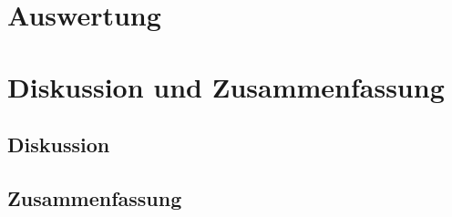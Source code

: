 \documentclass[12pt,english,ngerman]{scrartcl}
\begin{document}
\section{Auswertung}\label{sec:Auswertung}


\section{Diskussion und Zusammenfassung}\label{sec:Diskussion} 
\subsection{Diskussion}


\subsection{Zusammenfassung}

\newpage

\printbibliography

\listoffigures

\listoftables
\end{document}
